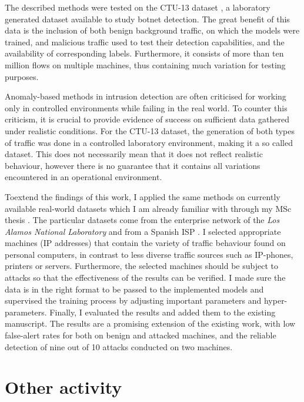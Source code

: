 \documentclass[a4paper,12pt,twoside]{report}
\begin{document}

The described methods were tested on the CTU-13 dataset \cite{garcia2014empirical}, a laboratory generated dataset available to study botnet detection. The great benefit of this data is the inclusion of both benign background traffic, on which the models were trained, and malicious traffic used to test their detection capabilities, and the availability of corresponding labels. Furthermore, it consists of more than ten million flows on multiple machines, thus containing much variation for testing purposes.

Anomaly-based methods in intrusion detection are often criticised for working only in controlled environments while failing in the real world. To counter this criticism, it is crucial to provide evidence of success on sufficient data gathered under realistic conditions. For the CTU-13 dataset, the generation of both types of traffic was done in a controlled laboratory environment, making it a so called  dataset. This does not necessarily mean that it does not reflect realistic behaviour, however there is no guarantee that it contains all variations encountered in an operational environment. 

Toextend the findings of this work, I applied the same methods on currently available real-world datasets which I am already familiar with through my MSc thesis \cite{clausen2018bayesian}. The particular datasets come from the enterprise network of the \textit{Los Alamos National Laboratory} \cite{kent-2015-cyberdata1} and from a Spanish ISP \cite{macia2018ugr}. I selected appropriate machines (IP addresses) that contain the variety of traffic behaviour found on personal computers, in contrast to less diverse traffic sources such as IP-phones, printers or servers. Furthermore, the selected machines should be subject to attacks so that the effectiveness of the results can be verified. I made sure the data is in the right format to be passed to the implemented models and supervised the training process by adjusting important parameters and hyper-parameters. Finally, I evaluated the results and added them to the existing manuscript. The results are a promising extension of the existing work,
with low false-alert rates for both on benign and attacked machines, and the reliable detection of nine out of 10 attacks conducted on two machines. 

\section{Other activity}
\end{document}
